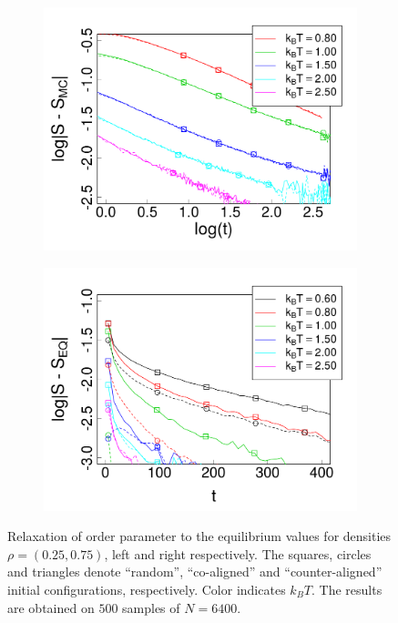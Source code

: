 \begin{figure}[t]
\centering
\begin{subfigure}[t]{0.7\columnwidth}
	\centering
	\includegraphics[width=\textwidth]{Images/relax_op_25}
\end{subfigure}
\begin{subfigure}[t]{0.7\columnwidth}
	\centering
	\includegraphics[width=\textwidth]{Images/relax_op_75_exp}
\end{subfigure}
	\captionsetup{width=0.9\columnwidth}
	\caption{Relaxation of order parameter to the equilibrium values for densities $\rho = (0.25, 0.75)$, left and right respectively. The squares, circles and triangles denote ``random'', ``co-aligned'' and ``counter-aligned'' initial configurations, respectively. Color indicates $k_BT$. The results are obtained on $500$ samples of $N = 6400$.}
	\label{fig:op_relaxation}
\end{figure}

